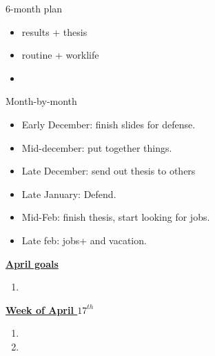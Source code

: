 \documentclass[serif, mathserif, final]{beamer}
\begin{document}
{\begin{frame}{}
\begin{columns}
\begin{column}{0.5\linewidth}
    \begin{block}{ 6-month plan}
      \begin{itemize}
        \small \item \small results + thesis
      \item \small routine + worklife
      \item \small 
      \end{itemize}
    \end{block} 

    \begin{block}{Month-by-month}
      \begin{itemize}
      \item \small Early December: finish slides for defense.
      \item \small Mid-december: put together things. 
      \item \small Late December: send out thesis to others 
      \item \small Late January: Defend.
      \item \small Mid-Feb: finish thesis, start looking for jobs. 
      \item \small Late feb: jobs+ and vacation. 
      \end{itemize}
    \end{block}
    
\begin{block}{\underline{\textbf{April goals}}}
\begin{enumerate}
\small \item \small 
\end{enumerate}
\end{block}

\begin{block}{\small \underline{\textbf{Week of April $17^{th}$}}}
\begin{enumerate}
\tiny \item \tiny 
\item \tiny 
\end{enumerate}
\end{block}
\end{column}




\end{columns}
\end{frame}}
\end{document}
